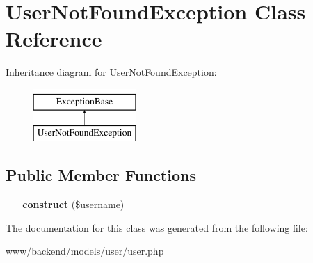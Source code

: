 \hypertarget{classUserNotFoundException}{
\section{UserNotFoundException Class Reference}
\label{classUserNotFoundException}
}
Inheritance diagram for UserNotFoundException:\begin{figure}[H]
\begin{center}
\leavevmode
\includegraphics[height=2.000000cm]{classUserNotFoundException}
\end{center}
\end{figure}
\subsection*{Public Member Functions}
\begin{DoxyCompactItemize}
\item 
\hypertarget{classUserNotFoundException_a356015a1765e4c30fdc37733d7e971ce}{
{\bfseries \_\-\_\-construct} (\$username)}
\label{classUserNotFoundException_a356015a1765e4c30fdc37733d7e971ce}

\end{DoxyCompactItemize}


The documentation for this class was generated from the following file:\begin{DoxyCompactItemize}
\item 
www/backend/models/user/user.php\end{DoxyCompactItemize}
